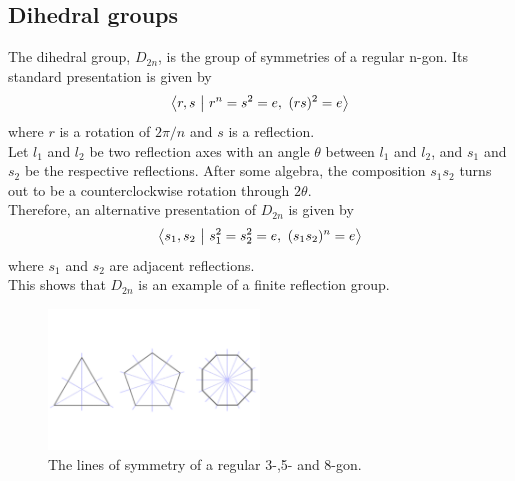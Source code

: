 \documentclass[../main.tex]{subfiles}
\begin{document}
\subsection{Dihedral groups}

The dihedral group, $D_{2n}$, is the group of symmetries of a regular n-gon. Its standard presentation is given by
\[
\left\langle r,s \ \middle| \  r^n = s^2 = e, \ (rs)^2 = e \right\rangle
\]
where $r$ is a rotation of $2\pi/n$ and $s$ is a reflection.\\

Let $l_{1}$ and $l_{2}$ be two reflection axes with an angle $\theta$ between $l_{1}$ and $l_{2}$, and $s_{1}$ and $s_{2}$ be the respective reflections. After some algebra, the composition $s_{1}s_{2}$ turns out to be a counterclockwise rotation through $2\theta$.\\

Therefore, an alternative presentation of $D_{2n}$ is given by
\[
\left\langle s_1,s_2 \ \middle| \ s_1^2 = s_2^2 = e, \ (s_1s_2)^n = e \right\rangle
\]
where $s_{1}$ and $s_{2}$ are adjacent reflections.\\

This shows that $D_{2n}$ is an example of a finite reflection group.

\begin{figure}[ht]
    \centering
    \includegraphics[width=0.5\textwidth]{polygons.pdf}
    \caption{The lines of symmetry of a regular 3-,5- and 8-gon.}
    \label{fig:dihedrals}
\end{figure}
\end{document}
